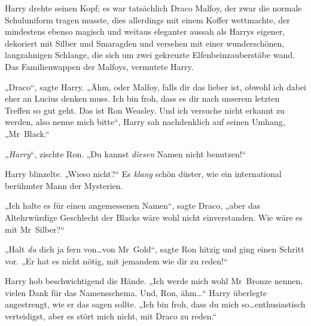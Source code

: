Harry drehte seinen Kopf; es war tatsächlich Draco Malfoy, der zwar die normale Schuluniform tragen musste, dies allerdings mit einem Koffer wettmachte, der mindestens ebenso magisch und weitaus eleganter aussah als Harrys eigener, dekoriert mit Silber und Smaragden und versehen mit einer wunderschönen, langzahnigen Schlange, die sich um zwei gekreuzte Elfenbeinzauberstäbe wand. Das Familienwappen der Malfoys, vermutete Harry.

„Draco“, sagte Harry. „Ähm, oder Malfoy, falls dir das lieber ist, obwohl ich dabei eher an Lucius denken muss. Ich bin froh, dass es dir nach unserem letzten Treffen so gut geht. Das ist Ron Weasley. Und ich versuche nicht erkannt zu werden, also nenne mich bitte“, Harry sah nachdenklich auf seinen Umhang, „Mr~Black.“

„\emph{Harry}“, zischte Ron. „Du kannst \emph{diesen} Namen nicht benutzen!“

Harry blinzelte. „Wieso nicht?“ Es \emph{klang} schön düster, wie ein international berühmter Mann der Mysterien.

„Ich halte es für einen angemessenen Namen“, sagte Draco, „aber das Altehrwürdige Geschlecht der Blacks wäre wohl nicht einverstanden. Wie wäre es mit Mr~Silber?“

„Halt \emph{du} dich ja fern von…von Mr~Gold“, sagte Ron hitzig und ging einen Schritt vor. „Er hat es nicht nötig, mit jemandem wie dir zu reden!“

Harry hob beschwichtigend die Hände. „Ich werde mich wohl Mr~Bronze nennen, vielen Dank für das Namensschema. Und, Ron, ähm…“ Harry überlegte angestrengt, wie er das sagen sollte. „Ich bin froh, dass du mich so…enthusiastisch verteidigst, aber es stört mich nicht, mit Draco zu reden.“

